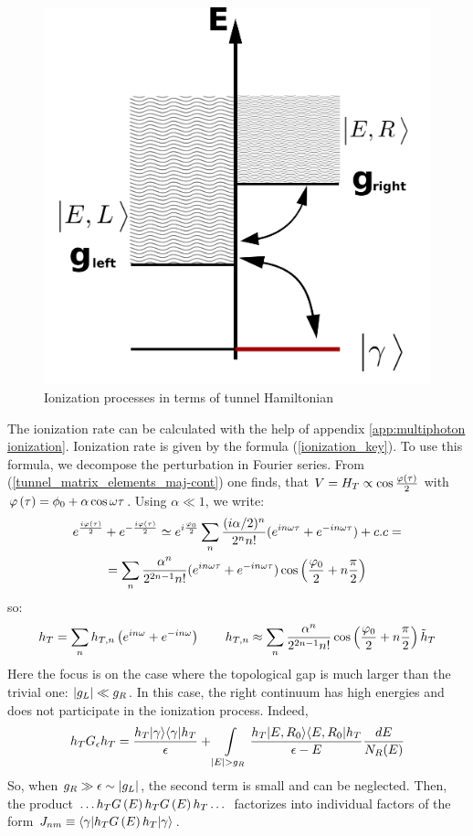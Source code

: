 \begin{figure}[H]
	\centering
	\includegraphics[width=0.65\linewidth]{images/tunneling}
	\caption{Ionization processes in terms of tunnel Hamiltonian}
	\label{fig:tunneling}
\end{figure}

The ionization rate can be calculated with the help of appendix \ref{app:multiphoton ionization}. Ionization rate is given by the formula   (\ref{ionization_key}). To use this formula, we decompose the  perturbation in Fourier series. From  (\ref{tunnel_matrix_elements_maj-cont}) one finds, that $ V=H_T\propto\cos\frac{\varphi\left(\tau\right)}{2} $ with $ \varphi\left(\tau\right)=\phi_{0}+\alpha\cos\omega \tau $. Using $ \alpha\ll1 $, we write:
\begin{multline}
	e^{\frac{i\varphi\left(\tau\right)}{2}}+e^{-\frac{i\varphi\left(\tau\right)}{2}}\simeq e^{i\frac{\varphi_{0}}{2}}\sum_{n}\frac{(i\alpha/2)^{n}}{2^{n}n!}(e^{in\omega \tau}+e^{-in\omega \tau})+c.c=
	\\
	=\sum_{n}\frac{\alpha{}^{n}}{2^{2n-1}n!}(e^{in\omega \tau}+e^{-in\omega \tau})\cos\left(\frac{\varphi_{0}}{2}+n\frac{\pi}{2}\right)
\end{multline}
so:
\begin{gather}
	h_{T}=
	\sum_n
	h_{T,n}
	\left(
	e^{in\omega }
	+
	e^{-in\omega }
	\right)
	\qquad
	h_{T,n}
	\approx
	\sum_{n}	
	\frac
	{\alpha^{n}}
	{2^{2n-1}n!}
	\cos\left(\frac{\varphi_{0}}{2}+n\frac{\pi}{2}\right)
	\tilde{h}_{T}
\end{gather}
Here the focus is on the case where the topological gap is much larger than the trivial one: $ \left|g_L\right|\ll g_R $. In this case, the right continuum has high energies and does not participate in the ionization process. Indeed,
\begin{gather}
	h_T G_{\epsilon} h_T
	=
	\frac{h_T|\gamma\rangle\langle\gamma|h_T}{\epsilon}
	+
	\intop_{|E|>g_{R}}
	\frac{h_T|E,R_0\rangle\langle E,R_0|h_T}{\epsilon-E}\frac{dE}{N_{R}(E)}
\end{gather}
So, when $ g_{R}\gg\epsilon\sim \left|g_L\right| $, the second term is small and can be neglected. Then, the product $ \dots h_TG\left(E\right)h_TG\left(E\right)h_T\dots $ factorizes into individual factors of the form $ J_{nm}\equiv\langle\gamma|h_TG\left(E\right)h_T|\gamma\rangle $.

